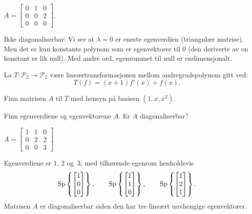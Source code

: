 \begin{losning}

\begin{punkt}
$A=\begin{bmatrix}
0 & 1 & 0\\
0 & 0 & 2\\
0 & 0 & 0
\end{bmatrix}$.
\end{punkt}

\begin{punkt}
Ikke diagonaliserbar: Vi ser at $\lambda=0$ er eneste egenverdien (triangulær matrise). Men det er kun konstante polynom som er egenvektorer til 0 (den deriverte av en konstant er lik null). Med andre ord, egenrommet til null er endimensjonalt.
\end{punkt}
\end{losning}



\begin{oppgave}
La $T:\mathcal{P}_2\rightarrow \mathcal{P}_2$ være lineærtransformasjonen mellom andregradspolynom gitt ved: $$T(f)=(x+1)f'(x)+f(x).$$

\begin{punkt}
Finn matrisen $A$ til $T$ med hensyn på basisen $(1,x,x^2)$.
\end{punkt}


\begin{punkt}
Finn egenverdiene og egenvektorene $A$. Er $A$ diagonaliserbar?
\end{punkt}
\end{oppgave}


\begin{losning}
\begin{punkt}
$
A =
\begin{bmatrix}
1 & 1 & 0 \\
0 & 2 & 2 \\
0 & 0 & 3
\end{bmatrix}
$
\end{punkt}

\begin{punkt}
Egenverdiene er $1$, $2$ og~$3$, med tilhørende egenrom henholdsvis
\[
\operatorname{Sp} \left\{ \begin{bmatrix} 1 \\ 0 \\ 0 \end{bmatrix} \right\},\qquad
\operatorname{Sp} \left\{ \begin{bmatrix} 1 \\ 1 \\ 0 \end{bmatrix} \right\},\qquad
\operatorname{Sp} \left\{ \begin{bmatrix} 1 \\ 2 \\ 1 \end{bmatrix} \right\}.
\]
Matrisen $A$ er diagonaliserbar siden den har tre lineært uavhengige
egenvektorer.
\end{punkt}
\end{losning}



